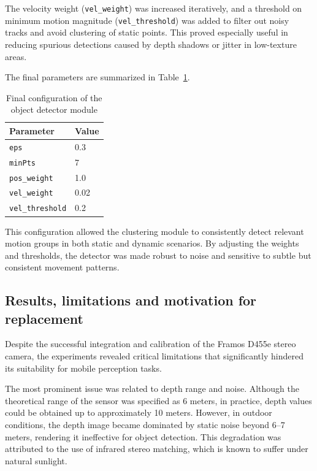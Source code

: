 The velocity weight (\texttt{vel\_weight}) was increased iteratively, 
and a threshold on minimum motion magnitude (\texttt{vel\_threshold}) 
was added to filter out noisy tracks and avoid clustering of static points. 
This proved especially useful in reducing spurious detections caused by 
depth shadows or jitter in low-texture areas.

The final parameters are summarized in Table~\ref{tab:object_detector_params}.

\begin{table}[H]
  \centering
  \begin{tabular}{l l}
    \toprule
    \textbf{Parameter} & \textbf{Value} \\
    \midrule
    \texttt{eps}            & 0.3 \\
    \texttt{minPts}         & 7 \\
    \texttt{pos\_weight}    & 1.0 \\
    \texttt{vel\_weight}    & 0.02 \\
    \texttt{vel\_threshold} & 0.2 \\
    \bottomrule
  \end{tabular}
  \caption{Final configuration of the object detector module}\label{tab:object_detector_params}
\end{table}

This configuration allowed the clustering module to consistently detect 
relevant motion groups in both static and dynamic scenarios. By adjusting 
the weights and thresholds, the detector was made robust to noise and 
sensitive to subtle but consistent movement patterns.


\subsection{Results, limitations and motivation for replacement}\label{sec:FramosLimitations}

Despite the successful integration and calibration of the Framos D455e stereo 
camera, the experiments revealed critical limitations that significantly hindered 
its suitability for mobile perception tasks.

The most prominent issue was related to depth range and noise. Although the 
theoretical range of the sensor was specified as 6 meters, in practice, depth values 
could be obtained up to approximately 10 meters. However, in outdoor conditions, 
the depth image became dominated by static noise beyond 6--7 meters, rendering 
it ineffective for object detection. This degradation was attributed to the use of 
infrared stereo matching, which is known to suffer under natural sunlight.

